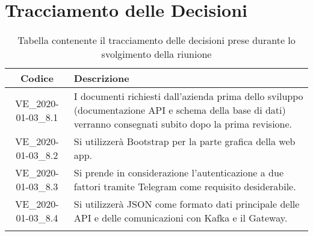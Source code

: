 \section*{Tracciamento delle Decisioni}

\begin{center}
	\begin{longtable}{|c|p{12.25cm}|}
	\hline
	\rowcolor{lighter-grayer}
	\textbf{Codice} & \textbf{Descrizione} \\
	\hline
	\endfirsthead
	
	\hline
	VE\_2020-01-03\_8.1 & I documenti richiesti dall'azienda prima dello sviluppo (documentazione API e schema della base di dati) verranno consegnati subito dopo la prima revisione. \\
	\hline
	VE\_2020-01-03\_8.2 & Si utilizzerà Bootstrap per la parte grafica della web app. \\
	\hline
	VE\_2020-01-03\_8.3 & Si prende in considerazione l'autenticazione a due fattori tramite Telegram come requisito desiderabile. \\
	\hline
	VE\_2020-01-03\_8.4 & Si utilizzerà JSON come formato dati principale delle API e delle comunicazioni con Kafka e il Gateway. \\
	\hline
	\caption{Tabella contenente il tracciamento delle decisioni prese durante lo svolgimento della riunione}
	\end{longtable}
\end{center}